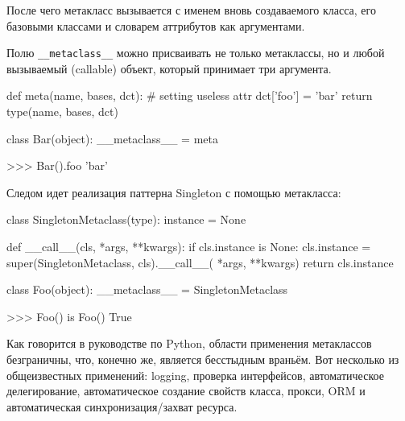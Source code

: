 После чего метакласс вызывается с именем вновь создаваемого класса, его базовыми классами и словарем аттрибутов как аргументами.

Полю \lstinline{__metaclass__} можно присваивать не только метаклассы, но и любой вызываемый (callable) объект, который принимает три аргумента.
\begin{pylst}{}{}
def meta(name, bases, dct):
    # setting useless attr
    dct['foo'] = 'bar'
    return type(name, bases, dct)

class Bar(object):
    __metaclass__ = meta

>>> Bar().foo
'bar'
\end{pylst}

Следом идет реализация паттерна Singleton с помощью метакласса:
\begin{pylst}{}{}
class SingletonMetaclass(type):
    instance = None

    def __call__(cls, *args, **kwargs):
        if cls.instance is None:
            cls.instance = super(SingletonMetaclass, cls).__call__(
                *args, **kwargs)
        return cls.instance

class Foo(object):
     __metaclass__ = SingletonMetaclass

>>> Foo() is Foo()
True
\end{pylst}

Как говорится в руководстве по Python, области применения метаклассов безграничны, что, конечно же, является бесстыдным враньём. Вот несколько из общеизвестных применений: logging, проверка интерфейсов, автоматическое делегирование, автоматическое создание свойств класса, прокси, ORM и автоматическая синхронизация/захват ресурса.

